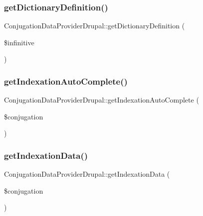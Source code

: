 \subsubsection{\texorpdfstring{get\+Dictionary\+Definition()}{getDictionaryDefinition()}}
{\footnotesize\ttfamily Conjugation\+Data\+Provider\+Drupal\+::get\+Dictionary\+Definition (\begin{DoxyParamCaption}\item[{}]{\$infinitive }\end{DoxyParamCaption})}

\hypertarget{class_conjugation_data_provider_drupal_a9b0687eb6a86dfc120f72db8f622b3e2}{}\label{class_conjugation_data_provider_drupal_a9b0687eb6a86dfc120f72db8f622b3e2} 
\subsubsection{\texorpdfstring{get\+Indexation\+Auto\+Complete()}{getIndexationAutoComplete()}}
{\footnotesize\ttfamily Conjugation\+Data\+Provider\+Drupal\+::get\+Indexation\+Auto\+Complete (\begin{DoxyParamCaption}\item[{}]{\$conjugation }\end{DoxyParamCaption})}

\hypertarget{class_conjugation_data_provider_drupal_a3cd6ea1c1628a03e31095b3c5589e9b7}{}\label{class_conjugation_data_provider_drupal_a3cd6ea1c1628a03e31095b3c5589e9b7} 
\subsubsection{\texorpdfstring{get\+Indexation\+Data()}{getIndexationData()}}
{\footnotesize\ttfamily Conjugation\+Data\+Provider\+Drupal\+::get\+Indexation\+Data (\begin{DoxyParamCaption}\item[{}]{\$conjugation }\end{DoxyParamCaption})}

